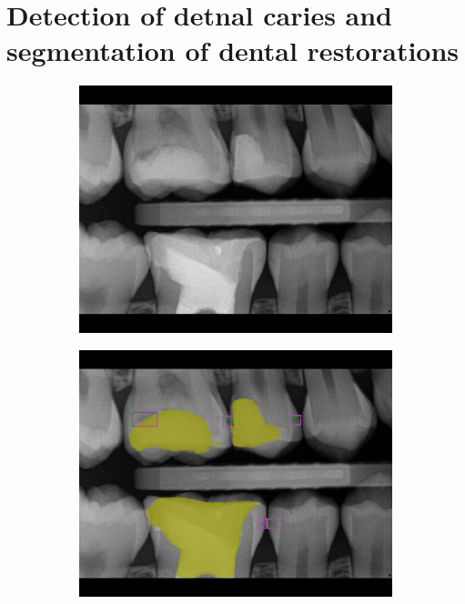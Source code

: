 \section{Detection of detnal caries and segmentation of dental restorations}
\begin{figure}[h]
    \centering
    \begin{subfigure}[b]{0.9\textwidth}
        \includegraphics[width=1\linewidth]{images/det1orig.png}
    \end{subfigure}

    \begin{subfigure}[b]{0.9\textwidth}
        \includegraphics[width=1\linewidth]{images/det1pred.png}
    \end{subfigure}
\end{figure}



